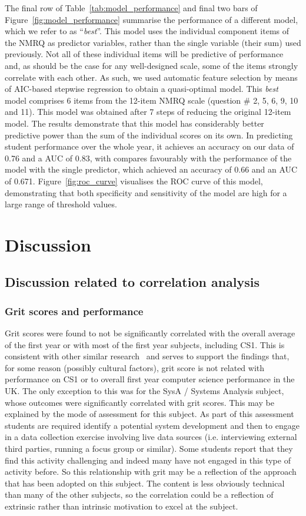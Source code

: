 \documentclass[sigconf]{acmart}
\begin{document}
The final row of Table~\ref{tab:model_performance} and final two bars of Figure~\ref{fig:model_performance} summarise the performance of a different model, which we refer to as ``{\em best}''. This model uses the individual component items of the NMRQ as predictor variables, rather than the single variable (their sum) used previously. Not all of these individual items will be predictive of performance and, as should be the case for any well-designed scale, some of the items strongly correlate with each other. As such, we used  automatic feature selection by means of AIC-based stepwise regression to obtain a quasi-optimal model. This {\em best} model comprises 6 items from the 12-item NMRQ scale (question \# 2, 5, 6, 9, 10 and 11). This model was obtained after 7 steps of reducing the original 12-item model. The results demonstrate that this model has considerably better predictive power than the sum of the individual scores on its own. In predicting student performance over the whole year, it achieves an accuracy on our data of 0.76 and a AUC of 0.83, with compares favourably with the performance of the model with the single predictor, which achieved an accuracy of 0.66 and an AUC of 0.671. Figure~\ref{fig:roc_curve} visualises the ROC curve of this model, demonstrating that both specificity and sensitivity of the model are high for a large range of threshold values.

\section{Discussion}
\subsection{Discussion related to correlation analysis}
\subsubsection{Grit scores and performance}
Grit scores were found to not be significantly correlated with the overall average of the first year or with most of the first year subjects, including CS1. This is consistent with other similar research~\cite{Sigurdson:2018:EGC:3279720.3279743} and serves to support the findings that, for some reason (possibly cultural factors), grit score is not related with performance on CS1 or to overall first year computer science performance in the UK. The only exception to this was for the SysA / Systems Analysis subject, whose outcomes were significantly correlated with grit scores. This may be explained by the mode of assessment for this subject. As part of this assessment students are required identify a potential system development and then to engage in a data collection exercise involving live data sources (i.e. interviewing external third parties, running a focus group or similar). Some students report that they find this activity challenging and indeed many have not engaged in this type of activity before. So this relationship with grit may be a reflection of the approach that has been adopted on this subject. The content is less obviously technical than many of the other subjects, so the correlation could be a reflection of extrinsic rather than intrinsic motivation to excel at the subject.
\end{document}
